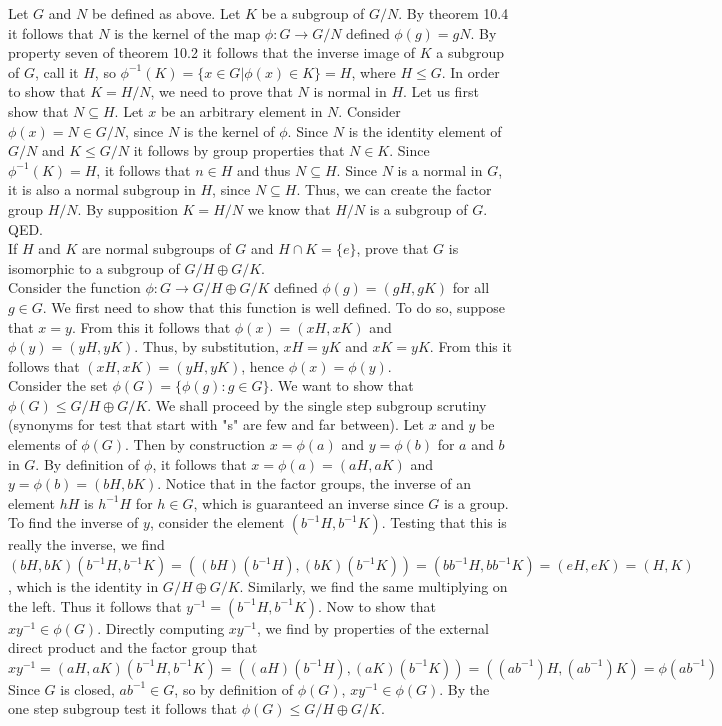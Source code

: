 \documentclass{article}
\begin{document}
 Let $G $ and $N$ be defined as above. Let $K$ be a subgroup of $G/N$. By theorem 10.4 it follows that $N$ is the kernel of the map $\phi:G\rightarrow G/N$ defined $\phi(g) = gN$. By property seven of theorem 10.2 it follows that the inverse image of $K$ a subgroup of $G$, call it $H$, so $\phi^{-1}(K)=\{x \in G | \phi(x) \in K\}=H$, where $H \leq G$. In order to show that $K = H/N$, we need to prove that $N$ is normal in $H$. Let us first show that $N \subseteq H$. Let $x$ be an arbitrary element in $N$. Consider $\phi(x)=N \in G/N$, since $N$ is the kernel of $\phi$. Since $N$ is the identity element of $G/N$ and $K \leq G/N$ it follows by group properties that $N \in K$. Since $\phi^{-1}(K)=H$, it follows that $n \in H$ and thus $N \subseteq H$. Since $N$ is a normal in $G$, it is also a normal subgroup in $H$, since $N \subseteq H$. Thus, we can create the factor group $H/N$. By supposition $K=H/N$ we know that $H/N$ is a subgroup of $G$. QED.
\\
\newpage
{} If $H$ and $K$ are normal subgroups of $G$ and $H \cap K = \{e\}$, prove that $G$ is isomorphic to a subgroup of $G/H \oplus G/K$.\\

 Consider the function $\phi:G\rightarrow G/H\oplus G/K$ defined $\phi(g) = (gH,gK)$ for all $g\in G$. We first need to show that this function is well defined. To do so, suppose that $x = y$. From this it follows that $\phi(x) = (xH,xK)$ and $\phi(y) = (yH,yK)$. Thus, by substitution, $xH = yK$ and $xK = yK$. From this it follows that $(xH,xK) = (yH, yK)$, hence $\phi(x) = \phi(y)$.\\

Consider the set $\phi(G) = \{\phi(g) : g\in G\}$. We want to show that $\phi(G) \le G/H\oplus G/K$. We shall proceed by the single step subgroup scrutiny (synonyms for test that start with "s" are few and far between). Let $x$ and $y$ be elements of $\phi(G)$. Then by construction $x = \phi(a)$ and $y = \phi(b)$ for $a$ and $b$ in $G$. By definition of $\phi$, it follows that $x = \phi(a) = (aH, aK)$ and $y = \phi(b) = (bH, bK)$. Notice that in the factor groups, the inverse of an element $hH$ is $h^{-1}H$ for $h\in G$, which is guaranteed an inverse since $G$ is a group. To find the inverse of $y$, consider the element $(b^{-1}H, b^{-1}K)$. Testing that this is really the inverse, we find $(bH, bK)(b^{-1}H, b^{-1}K) = ((bH)(b^{-1}H),(bK)(b^{-1}K)) = (bb^{-1}H,bb^{-1}K) = (eH, eK) = (H, K)$, which is the identity in $G/H\oplus G/K$. Similarly, we find the same multiplying on the left. Thus it follows that $y^{-1} = (b^{-1}H, b^{-1}K)$. Now to show that $xy^{-1}\in \phi(G)$. Directly computing $xy^{-1}$, we find by properties of the external direct product and the factor group that $xy^{-1} = (aH, aK)(b^{-1}H, b^{-1}K) = ((aH)(b^{-1}H),(aK)(b^{-1}K)) = ((ab^{-1})H, (ab^{-1})K) = \phi(ab^{-1})$ Since $G$ is closed, $ab^{-1}\in G$, so by definition of $\phi(G)$, $xy^{-1}\in \phi(G)$. By the one step subgroup test it follows that $\phi(G)\le G/H\oplus G/K$.
\end{document}

